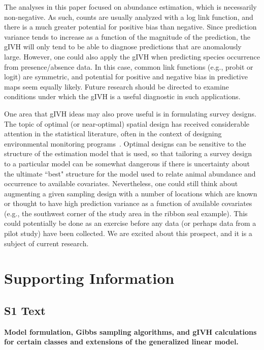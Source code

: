 \documentclass[10pt,letterpaper]{article}
\begin{document}
The analyses in this paper focused on abundance estimation, which is necessarily non-negative.  As such, counts are usually analyzed with a log link function, and there is a much greater potential for positive bias than negative.  Since prediction variance tends to increase as a function of the magnitude of the prediction, the gIVH will only tend to be able to diagnose predictions that are anomalously large.  However, one could also apply the gIVH when predicting species occurrence from presence/absence data.  In this case, common link functions (e.g., probit or logit) are symmetric, and potential for positive and negative bias in predictive maps seem equally likely.  Future research should be directed to examine conditions under which the gIVH is a useful diagnostic in such applications.

One area that gIVH ideas may also prove useful is in formulating survey designs.  The topic of optimal (or near-optimal) spatial design has received considerable attention in the statistical literature, often in the context of designing environmental monitoring programs~\cite{Muller2007}.  Optimal designs can be sensitive to the structure of the estimation model that is used, so that tailoring a survey design to a particular model can be somewhat dangerous if there is uncertainty about the ultimate ``best" structure for the model used to relate animal abundance and occurrence to available covariates.  Nevertheless, one could still think about augmenting a given sampling design with a number of locations which are known or thought to have high prediction variance as a function of available covariates (e.g., the southwest corner of the study area in the ribbon seal example).  This could potentially be done as an exercise before any data (or perhaps data from a pilot study) have been collected.  We are excited about this prospect, and it is a subject of current research.



\section*{Supporting Information}


\subsection*{S1 Text}
\label{S1_Text}
{\bf Model formulation, Gibbs sampling algorithms, and gIVH calculations for certain classes and extensions of the generalized linear model.}
\end{document}
